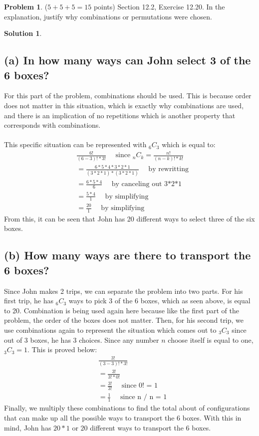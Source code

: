 \documentclass{article}
\theoremstyle{definition}
\newtheorem{problem}{Problem}
\newtheorem*{solution}{Solution}
\begin{document}
\newpage
\begin{problem} ($5+5+5=15$ points) Section 12.2, Exercise 12.20.
In the explanation, justify why combinations or permutations were chosen.
\end{problem}
\begin{solution}
\hspace{1cm}
\subsection*{(a) In how many ways can John select 3 of the 6 boxes?}
For this part of the problem, combinations should be used. This is because order does not matter in this situation, which is exactly why combinations are used, and there is an implication of no repetitions which is another property that corresponds with combinations.\\\\
This specific situation can be represented with ${}_6 C_3$ which is equal to:
\begin{align*}
&\frac{6!}{(6-3)!*3!} \quad \mbox{ since ${}_n C_k = \frac{n!}{(n-k)!*k!}$}\\
&=\frac{6 * 5 * 4 *3*2*1}{(3*2*1)*(3*2*1)} \quad \mbox{ by rewritting}\\
&= \frac{6*5*4}{6} \quad \mbox{ by canceling out 3*2*1}\\
&=\frac{5*4}{1} \quad \mbox{ by simplifying}\\
&=\frac{20}{1} \quad \mbox{ by simplifying}
\end{align*}
From this, it can be seen that John has 20 different ways to select three of the six boxes.
\subsection*{(b) How many ways are there to transport the 6 boxes?}
Since John makes 2 trips, we can separate the problem into two parts. For his first trip, he has ${}_6 C_3$ ways to pick 3 of the 6 boxes, which as seen above, is equal to 20. Combination is being used again here because like the first part of the problem, the order of the boxes does not matter. Then, for his second trip, we use combinations again to represent the situation which comes out to ${}_3 C_3$ since out of 3 boxes, he has 3 choices. Since any number $n$ choose itself is equal to one, ${}_3 C_3 = 1$. This is proved below:
\begin{align*}
&\frac{3!}{(3-3)!*3!}\\
&=\frac{3!}{3!*0!}\\
&=\frac{3!}{3!} \quad \mbox{ since 0! = 1}\\
&= \frac{1}{1} \quad \mbox{ since n / n = 1}
\end{align*}
Finally, we multiply these combinations to find the total about of configurations that can make up all the possible ways to transport the 6 boxes. With this in mind, John has $20 * 1$ or $20$ different ways to transport the 6 boxes.

\end{solution}
\end{document}

